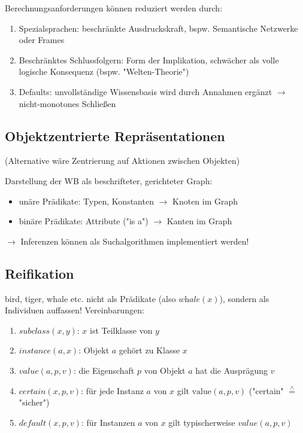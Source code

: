 \documentclass[runningheads,deutsch]{llncs}
\newcommand{\estimates}{\overset{\scriptscriptstyle\wedge}{=}}
\begin{document}
Berechnungsanforderungen können reduziert werden durch:

\begin{enumerate}
    \item Spezialsprachen: beschränkte Ausdruckskraft, bspw. Semantische Netzwerke oder Frames
    \item Beschränktes Schlussfolgern: Form der Implikation, schwächer als volle logische Konsequenz (bspw. "Welten-Theorie")
    \item Defaults: unvollständige Wissensbasis wird durch Annahmen ergänzt $\rightarrow$ nicht-monotones Schließen
\end{enumerate}

\subsection{Objektzentrierte Repräsentationen}
(Alternative wäre Zentrierung auf Aktionen zwischen Objekten)

Darstellung der WB als beschrifteter, gerichteter Graph:
\begin{itemize}
    \item unäre Prädikate: Typen, Konstanten $\rightarrow$ Knoten im Graph
    \item binäre Prädikate: Attribute ("is a") $\rightarrow$ Kanten im Graph
\end{itemize}

$\rightarrow$ Inferenzen können als Suchalgorithmen implementiert werden!

\subsection{Reifikation}

bird, tiger, whale etc. nicht als Prädikate (also $\textit{whale}(x)$), sondern als Individuen auffassen! Vereinbarungen:

\begin{enumerate}
    \item $\textit{subclass}(x, y)$: $x$ ist Teilklasse von $y$
    \item $\textit{instance}(a, x)$: Objekt $a$ gehört zu Klasse $x$
    \item $\textit{value}(a, p, v)$: die Eigenschaft $p$ von Objekt $a$ hat die Ausprägung $v$
    \item $\textit{certain}(x, p, v)$: für jede Instanz $a$ von $x$ gilt $\text{value}(a, p, v)$ ("certain" $\estimates$ "sicher")
    \item $\textit{default}(x, p, v)$: für Instanzen $a$ von $x$ gilt typischerweise $\textit{value}(a, p, v)$
\end{enumerate}
\end{document}
